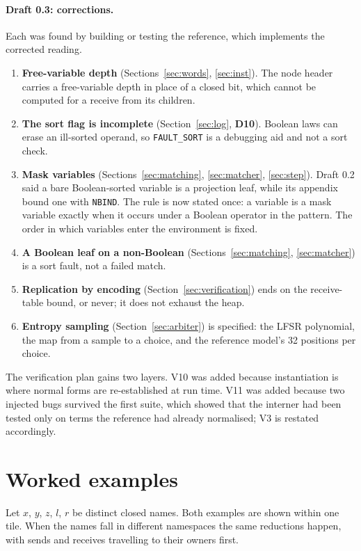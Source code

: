 \documentclass[11pt]{article}
\newcommand{\kw}[1]{\texttt{#1}}
\newcommand{\dec}[1]{\textbf{D#1}}
\theoremstyle{definition}
\theoremstyle{remark}
\begin{document}
\paragraph{Draft 0.3: corrections.} Each was found by building or testing the reference,
which implements the corrected reading.
\begin{enumerate}
\item \textbf{Free-variable depth} (Sections~\ref{sec:words},
\ref{sec:inst}). The node header carries a free-variable depth in place of a
closed bit, which cannot be computed for a receive from its children.
\item \textbf{The sort flag is incomplete} (Section~\ref{sec:log}, \dec{10}).
Boolean laws can erase an ill-sorted operand, so \kw{FAULT\_SORT} is a
debugging aid and not a sort check.
\item \textbf{Mask variables} (Sections~\ref{sec:matching},
\ref{sec:matcher}, \ref{sec:step}). Draft 0.2 said a bare Boolean-sorted
variable is a projection leaf, while its appendix bound one with \kw{NBIND}.
The rule is now stated once: a variable is a mask variable exactly when it
occurs under a Boolean operator in the pattern. The order in which variables
enter the environment is fixed.
\item \textbf{A Boolean leaf on a non-Boolean} (Sections~\ref{sec:matching},
\ref{sec:matcher}) is a sort fault, not a failed match.
\item \textbf{Replication by encoding} (Section~\ref{sec:verification}) ends
on the receive-table bound, or never; it does not exhaust the heap.
\item \textbf{Entropy sampling} (Section~\ref{sec:arbiter}) is specified: the
LFSR polynomial, the map from a sample to a choice, and the reference
model's 32 positions per choice.
\end{enumerate}
The verification plan gains two layers. V10 was added because instantiation
is where normal forms are re-established at run time. V11 was added because
two injected bugs survived the first suite, which showed that the interner
had been tested only on terms the reference had already normalised; V3 is
restated accordingly.

\appendix
\section{Worked examples}\label{sec:examples}

Let $x$, $y$, $z$, $l$, $r$ be distinct closed names. Both examples are
shown within one tile. When the names fall in different namespaces the same
reductions happen, with sends and receives travelling to their owners first.
\end{document}
